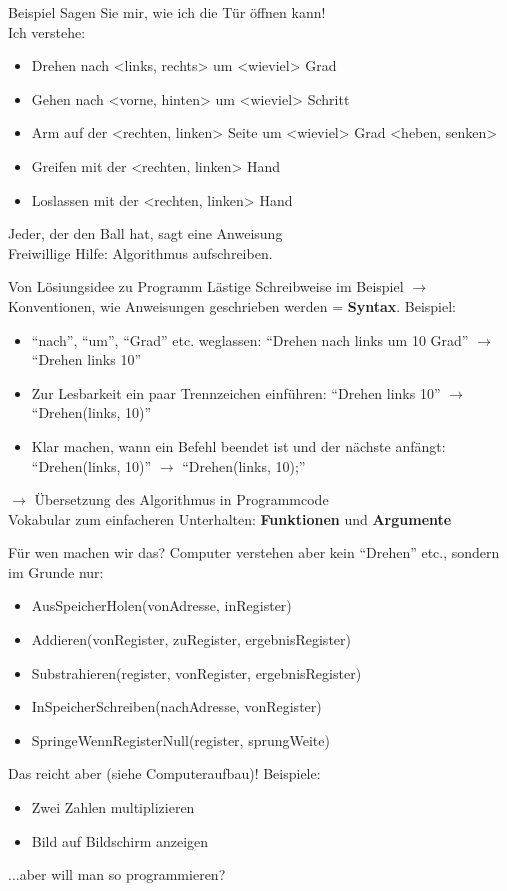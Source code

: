 \documentclass[aspectratio=169,t]{beamer}
\begin{document}
\begin{frame}{Beispiel}
	Sagen Sie mir, wie ich die Tür öffnen kann!\\Ich verstehe:
	\begin{itemize}
		\item Drehen nach <links, rechts> um <wieviel> Grad
		\item Gehen nach <vorne, hinten> um <wieviel> Schritt
		\item Arm auf der <rechten, linken> Seite um <wieviel> Grad <heben, senken>
		\item Greifen mit der <rechten, linken> Hand
		\item Loslassen mit der <rechten, linken> Hand
	\end{itemize}
	Jeder, der den Ball hat, sagt eine Anweisung\\Freiwillige Hilfe: Algorithmus aufschreiben.
\end{frame}

\begin{frame}{Von Lösiungsidee zu Programm}
	Lästige Schreibweise im Beispiel $\rightarrow$ Konventionen, wie Anweisungen geschrieben werden = \textbf{Syntax}. Beispiel:
	\begin{itemize}
		\item ``nach'', ``um'', ``Grad'' etc. weglassen: ``Drehen nach links um 10 Grad'' $\rightarrow$ ``Drehen links 10''
		\item Zur Lesbarkeit ein paar Trennzeichen einführen: ``Drehen links 10'' $\rightarrow$ ``Drehen(links, 10)''
		\item Klar machen, wann ein Befehl beendet ist und der nächste anfängt: ``Drehen(links, 10)'' $\rightarrow$ ``Drehen(links, 10);''
	\end{itemize}
	$\rightarrow$ Übersetzung des Algorithmus in Programmcode
	\\Vokabular zum einfacheren Unterhalten: \textbf{Funktionen} und \textbf{Argumente}
\end{frame}

\begin{frame}{Für wen machen wir das?}
	Computer verstehen aber kein ``Drehen'' etc., sondern im Grunde nur:
	\begin{itemize}
		\item AusSpeicherHolen(vonAdresse, inRegister)
		\item Addieren(vonRegister, zuRegister, ergebnisRegister)
		\item Substrahieren(register, vonRegister, ergebnisRegister)
		\item InSpeicherSchreiben(nachAdresse, vonRegister)
		\item SpringeWennRegisterNull(register, sprungWeite)
	\end{itemize}
	Das reicht aber (siehe Computeraufbau)! Beispiele:
	\begin{itemize}
		\item Zwei Zahlen multiplizieren
		\item Bild auf Bildschirm anzeigen
	\end{itemize}
	...aber will man so programmieren?
\end{frame}
\end{document}

